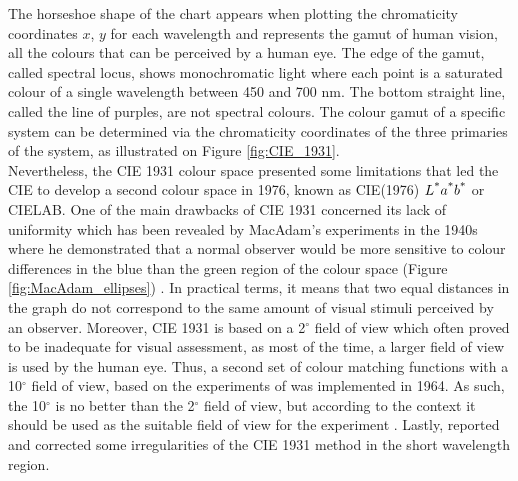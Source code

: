 The horseshoe shape of the chart appears when plotting the chromaticity coordinates $x$, $y$ for each wavelength and represents the gamut of human vision, \ie all the colours that can be perceived by a human eye. The edge of the gamut, called spectral locus, shows monochromatic light where each point is a saturated colour of a single wavelength between 450 and 700 nm. The bottom straight line, called the line of purples, are not spectral colours. The colour gamut of a specific system can be determined via the chromaticity coordinates of the three primaries of the system, as illustrated on Figure \ref{fig:CIE_1931}.\\

Nevertheless, the \gls{CIE} 1931 colour space presented some limitations that led the \gls{CIE} to develop a second colour space in 1976, known as CIE(1976) $L\textsuperscript{*}a\textsuperscript{*}b\textsuperscript{*}$ or CIELAB. One of the main drawbacks of \gls{CIE} 1931 concerned its lack of uniformity which has been revealed by MacAdam’s experiments in the 1940s where he demonstrated that a normal observer would be more sensitive to colour differences in the blue than the green region of the colour space (Figure \ref{fig:MacAdam_ellipses}) \citep{macadam_graphical_1943, macadam_specification_1943}. In practical terms, it means that two equal distances in the graph do not correspond to the same amount of visual stimuli perceived by an observer. Moreover, CIE 1931 is based on a 2$^\circ$ field of view which often proved to be inadequate for visual assessment, as most of the time, a larger field of view is used by the human eye. Thus, a second set of colour matching functions with a 10$^\circ$ field of view, based on the experiments of \citet{stiles_npl_1959} was implemented in 1964. As such, the 10$^\circ$ is no better than the 2$^\circ$ field of view, but according to the context it should be used as the suitable field of view for the experiment \citep{cie_technical_committee_1-57_colorimetry_2007}. Lastly, \citet{vos_colorimetric_1978} reported and corrected some irregularities of the \gls{CIE} 1931 method in the short wavelength region.\\

